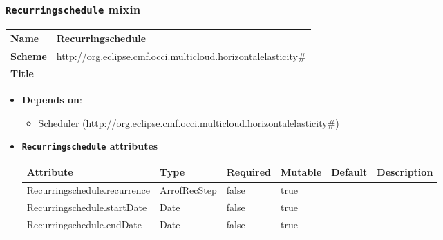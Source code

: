  
\subsubsection{\texttt{Recurringschedule} mixin}
\begin{center}
\begin{tabular}{|l|l|}
  \hline
  \textbf{Name} & Recurringschedule \\
  \hline  
  \textbf{Scheme} & http://org.eclipse.cmf.occi.multicloud.horizontalelasticity\# \\
  \hline
  \textbf{Title} &  \\
  \hline
\end{tabular}
\end{center}

\begin{itemize}
\item \textbf{Depends on}:
\begin{itemize}
	\item Scheduler (http://org.eclipse.cmf.occi.multicloud.horizontalelasticity\#)
\end{itemize}
\end{itemize}

\begin{itemize}
\item \textbf{\texttt{Recurringschedule} attributes}

\begin{tabularx}{\textwidth}{|l|l|p{1.4cm}|p{1.3cm}|l|X|}
  \hline
  \textbf{Attribute} & \textbf{Type} & \textbf{Required} & \textbf{Mutable} & \textbf{Default} & \textbf{Description} \\
  \hline  
  Recurringschedule.recurrence & ArrofRecStep & false & true &  &  \\
  \hline
  Recurringschedule.startDate & Date & false & true &  &  \\
  \hline
  Recurringschedule.endDate & Date & false & true &  &  \\
  \hline
\end{tabularx}
\end{itemize}


 
